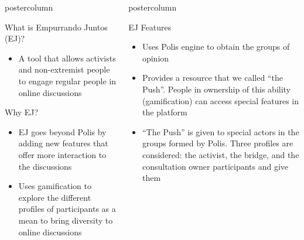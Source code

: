 \documentclass[final,hyperref={pdfpagelabels=false}]{beamer}
\newlength{\columnheight}
\begin{document}
\begin{frame}
\begin{columns}
\begin{column}{.49\textwidth}
\begin{beamercolorbox}[center,wd=\textwidth]{postercolumn}
\begin{minipage}[T]{.95\textwidth}
{\begin{block}{What is Empurrando Juntos (EJ)?}
\begin{itemize}
    \item A tool that allows activists and non-extremist people to engage regular
    people in online discussions
  \end{itemize}
\end{block}

\begin{block}{Why EJ?}
  \begin{itemize}
    \item EJ goes beyond Polis by adding new features that offer more interaction
    to the discussions

    \item Uses gamification to explore the different profiles of participants
    as a mean to bring diversity to online discussions
  \end{itemize}
\end{block}


}
\end{minipage}
\end{beamercolorbox}
\end{column}

\begin{column}{.49\textwidth}
  \begin{beamercolorbox}[center,wd=\textwidth]{postercolumn}
    \begin{minipage}[T]{.95\textwidth} %
      \parbox[t][\columnheight]{\textwidth}{ %

\begin{block}{EJ Features}
  \begin{itemize}
    \item Uses Polis engine to obtain the groups of opinion

    \item Provides a resource that we called ``the Push''. People in ownership of
    this ability (gamification) can access special features in the platform

    \item ``The Push'' is given to special actors in the groups formed by Polis.
    Three profiles are considered: the activist, the bridge, and the consultation
    owner participants and give them


\end{itemize}
\end{block}}
\end{minipage}
\end{beamercolorbox}
\end{column}
\end{columns}
\end{frame}
\end{document}
